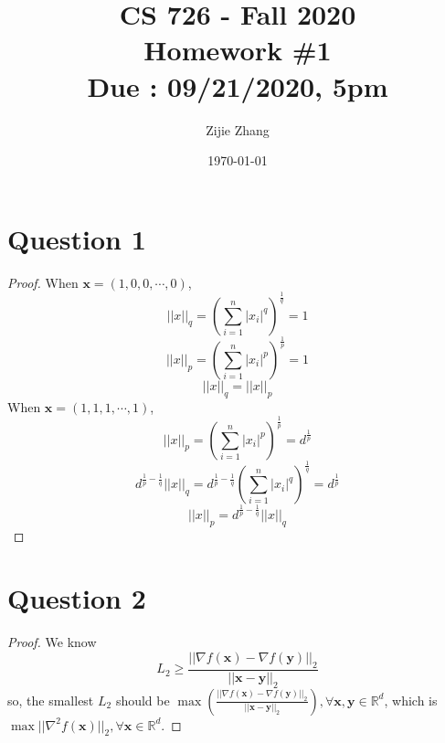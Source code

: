 \documentclass{article}
\title{CS 726 - Fall 2020\\
        {\Large \textbf{Homework \#1}}\\
        {\normalsize \textbf{Due : 09/21/2020, 5pm}}
    }
\author{Zijie Zhang}
\date{\today}
\begin{document}
    \maketitle

\section*{Question 1}
    \begin{proof}
        When $\boldsymbol{x} = (1,0,0,\cdots,0)$,
        $$ ||x||_q = \left(\sum_{i=1}^n|x_i|^q\right)^{\frac{1}{q}} = 1 $$
        $$ ||x||_p = \left(\sum_{i=1}^n|x_i|^p\right)^{\frac{1}{p}} = 1 $$
        $$ ||x||_q = ||x||_p $$
        When $\boldsymbol{x} = (1,1,1,\cdots,1)$,
        $$ ||x||_p = \left(\sum_{i=1}^n|x_i|^p\right)^{\frac{1}{p}} = d^{\frac{1}{p}} $$
        $$ d^{\frac{1}{p}-\frac{1}{q}}||x||_q = d^{\frac{1}{p}-\frac{1}{q}} \left(\sum_{i=1}^n|x_i|^q\right)^{\frac{1}{q}} = d^{\frac{1}{p}} $$
        $$ ||x||_p = d^{\frac{1}{p}-\frac{1}{q}}||x||_q $$
    \end{proof}

\section*{Question 2}
    \begin{proof}
        We know $$ L_2 \geqslant \frac{||\nabla f(\mathbf{x})-\nabla f(\mathbf{y})||_2}{||\mathbf{x}-\mathbf{y}||_2} $$
        so, the smallest $L_2$ should be $\max{\left(\frac{||\nabla f(\mathbf{x})-\nabla f(\mathbf{y})||_2}{||\mathbf{x}-\mathbf{y}||_2}\right)}, \forall \mathbf{x,y}\in \mathbb{R}^d$,
        which is $\max{||\nabla^2 f(\mathbf{x})||_2}, \forall \mathbf{x}\in \mathbb{R}^d$.

    \end{proof}

\end{document}
